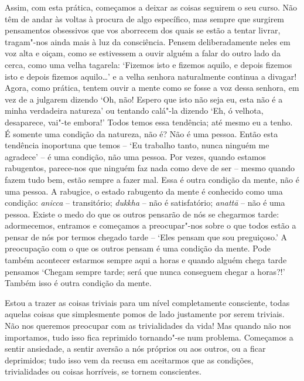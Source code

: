 Assim, com esta prática, começamos a deixar as coisas seguirem o seu
curso. Não têm de andar às voltas à procura de algo específico, mas
sempre que surgirem pensamentos obsessivos que vos aborrecem dos quais
se estão a tentar livrar, tragam"-nos ainda mais à luz da consciência.
Pensem deliberadamente neles em voz alta e oiçam, como se estivessem a
ouvir alguém a falar do outro lado da cerca, como uma velha tagarela:
`Fizemos isto e fizemos aquilo, e depois fizemos isto e depois fizemos
aquilo\ldots{}' e a velha senhora naturalmente continua a divagar!
Agora, como prática, tentem ouvir a mente como se fosse a voz dessa
senhora, em vez de a julgarem dizendo `Oh, não! Espero que isto não seja
eu, esta não é a minha verdadeira natureza' ou tentando calá"-la dizendo
`Eh, ó velhota, desaparece, vai"-te embora!' Todos temos essa tendência;
até mesmo eu a tenho. É somente uma condição da natureza, não é? Não é
uma pessoa. Então esta tendência inoportuna que temos -- `Eu trabalho
tanto, nunca ninguém me agradece' -- é uma condição, não uma pessoa. Por
vezes, quando estamos rabugentos, parece-nos que ninguém faz nada como 
deve de ser -- mesmo quando fazem tudo bem, estão sempre a fazer mal. 
Essa é outra condição da mente, não é uma pessoa.
A rabugice, o estado rabugento da mente é conhecido como
uma condição: \emph{anicca} -- transitório; \emph{dukkha} -- não é
satisfatório; \emph{anattā} -- não é uma pessoa. Existe o medo do que os
outros pensarão de nós se chegarmos tarde: adormecemos, entramos e
começamos a preocupar"-nos sobre o que todos estão a pensar de nós por
termos chegado tarde -- `Eles pensam que sou preguiçoso.' A preocupação
com o que os outros pensam é uma condição da mente. Pode também
acontecer estarmos sempre aqui a horas e quando alguém chega tarde
pensamos `Chegam sempre tarde; será que nunca conseguem chegar a
horas?!' Também isso é outra condição da mente.

Estou a trazer as coisas triviais para um nível completamente
consciente, todas aquelas coisas que simplesmente pomos de lado
justamente por serem triviais. Não nos queremos preocupar com as
trivialidades da vida! Mas quando não nos importamos, tudo isso fica
reprimido tornando"-se num problema. Começamos a sentir ansiedade, a
sentir aversão a nós próprios ou aos outros, ou a ficar deprimidos; tudo
isso vem da recusa em aceitarmos que as condições, trivialidades ou
coisas horríveis, se tornem conscientes.

